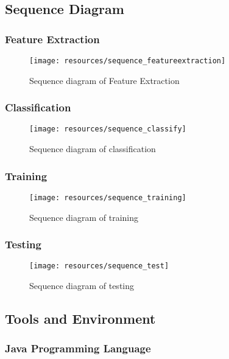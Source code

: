 \subsection{Sequence Diagram}
\subsubsection{Feature Extraction}
\begin{figure}[h!]
        \centering
        \texttt{[image: resources/sequence\_featureextraction]}
        \caption{Sequence diagram of Feature Extraction}
        \label{fig:sequence_featureextraction}
\end{figure}
\newpage
\subsubsection{Classification}
\begin{figure}[h!]
        \centering
        \texttt{[image: resources/sequence\_classify]}
        \caption{Sequence diagram of classification}
        \label{fig:sequence_classify}
\end{figure}
\newpage
\subsubsection{Training}
\begin{figure}[h!]
        \centering
        \texttt{[image: resources/sequence\_training]}
        \caption{Sequence diagram of training}
        \label{fig:sequence_training}
\end{figure}
\newpage
\newpage
\subsubsection{Testing}
\begin{figure}[h!]
        \centering
        \texttt{[image: resources/sequence\_test]}
        \caption{Sequence diagram of testing}
        \label{fig:sequence_test}
\end{figure}


\subsection{Tools and Environment}

\subsubsection{Java Programming Language}

